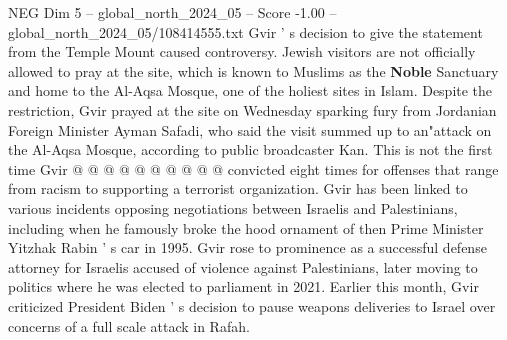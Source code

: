 \begin{textsample}{NEG Dim 5 – global\_north\_2024\_05 – Score -1.00 – global\_north\_2024\_05/108414555.txt}
Gvir ' s decision to give the statement from the Temple Mount caused controversy.
Jewish visitors are not officially allowed to pray at the site, which is known to Muslims as the \textbf{Noble} Sanctuary and home to the Al-Aqsa Mosque, one of the holiest sites in Islam.
Despite the restriction, Gvir prayed at the site on Wednesday sparking fury from Jordanian Foreign Minister Ayman Safadi, who said the visit summed up to an"attack on the Al-Aqsa Mosque, according to public broadcaster Kan.
This is not the first time Gvir @ @ @ @ @ @ @ @ @ @ convicted eight times for offenses that range from racism to supporting a terrorist organization.
Gvir has been linked to various incidents opposing negotiations between Israelis and Palestinians, including when he famously broke the hood ornament of then Prime Minister Yitzhak Rabin ' s car in 1995.
Gvir rose to prominence as a successful defense attorney for Israelis accused of violence against Palestinians, later moving to politics where he was elected to parliament in 2021.
Earlier this month, Gvir criticized President Biden ' s decision to pause weapons deliveries to Israel over concerns of a full scale attack in Rafah.

\end{textsample}
